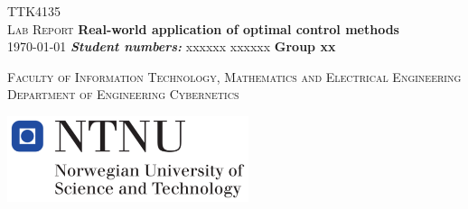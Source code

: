 \documentclass[pdftex,12pt,a4paper]{report}
\begin{document}
\begin{titlepage}
\begin{center}

\textsc{\LARGE TTK4135}\\[1.5cm]
\textsc{\LARGE Lab Report} \linebreak
{ \huge \bfseries \textcolor[rgb]{0,0,1}{Real-world application of optimal control methods}\\[0.5cm] }
\today \vspace{1cm} \linebreak 
\emph{\textbf{Student numbers:}} \linebreak 
xxxxxx \linebreak
xxxxxx \linebreak\linebreak \textbf{Group xx}  \vspace{3cm}\linebreak \linebreak

\textsc{Faculty of Information Technology, Mathematics and Electrical Engineering}\linebreak
\textsc{Department of Engineering Cybernetics} 
\vfill


\includegraphics[width=200pt, keepaspectratio=true]{logo}

\end{center}
\end{titlepage}
\end{document}
